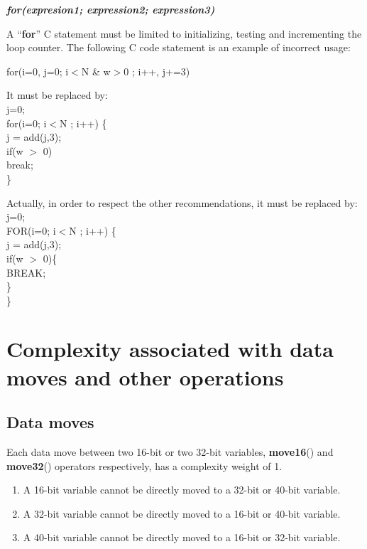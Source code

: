 \textbf{\emph{for(expresion1; expression2; expression3)}}

A ``\textbf{for}'' C statement must be limited to initializing,
testing and incrementing the loop counter. The following C code
statement is an example of incorrect usage:

for(i=0, j=0; i$<$N \& w$>$0 ; i++, j+=3)

It must be replaced by: \\
j=0;\\
for(i=0; i$<$N ; i++) \{\\
j = add(j,3);\\
if(w $>$ 0)\\
break; \\
\}

Actually, in order to respect the other recommendations, it must
be replaced by: \\
j=0;\\
FOR(i=0; i$<$N ; i++) \{\\
j = add(j,3);\\
if(w $>$ 0)\{\\
BREAK; \\
\}\\
\}


\section{Complexity associated with data moves and other operations}

\subsection{Data moves}

Each data move between two 16-bit or two 32-bit variables, \textbf{move16}() and \textbf{move32}() operators respectively, has a complexity weight of 1.

\begin{enumerate}{}{}
    \item A 16-bit variable cannot be directly moved to a 32-bit or 40-bit variable.
    \item A 32-bit variable cannot be directly moved to a 16-bit or 40-bit variable.
    \item A 40-bit variable cannot be directly moved to a 16-bit or 32-bit variable.
\end{enumerate}

